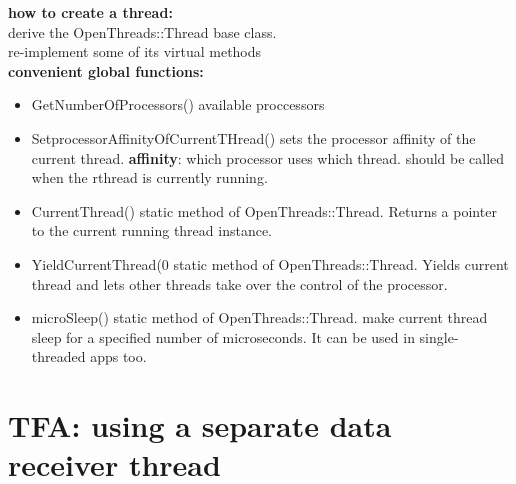 \documentclass[a4paper,12pt]{book}
\begin{document}
\textbf{how to create a thread:} \\
derive the OpenThreads::Thread base class.\\
re-implement some of its virtual methods\\

\textbf{convenient global functions:}
\begin{itemize}
\item GetNumberOfProcessors() available proccessors\\
\item SetprocessorAffinityOfCurrentTHread() sets the processor affinity of the current thread. \textbf{affinity}: which processor uses which thread. should be called when the rthread is currently running.\\
\item CurrentThread() static method of OpenThreads::Thread. Returns a pointer to the current running thread instance.
\item YieldCurrentThread(0 static method of OpenThreads::Thread. Yields current thread and lets other threads take over the control of the processor.
\item microSleep() static method of OpenThreads::Thread. make current thread sleep for a specified number of microseconds. It can be used in single-threaded apps too.
\end{itemize}

\section{TFA:  using a separate data receiver thread}
\end{document}
